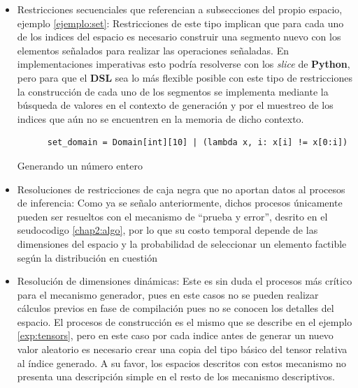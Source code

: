 \begin{itemize}
      \item Restricciones secuenciales que referencian a subsecciones del propio espacio, ejemplo \ref{ejemplo:set}: Restricciones de
            este tipo implican que para cada uno de los indices del espacio es necesario construir una segmento nuevo
            con los elementos señalados para realizar las operaciones señaladas. En implementaciones imperativas esto podría
            resolverse con los {\it slice} de {\bf Python}, pero para que el {\bf DSL} sea lo más flexible posible con este 
            tipo de restricciones la construcción de cada uno de los segmentos se implementa mediante la búsqueda de valores en el 
            contexto de generación y por el muestreo de los indices que aún no se encuentren en la memoria de dicho contexto.   

            \begin{listing}[!ht]
                  \begin{verbatim}
      set_domain = Domain[int][10] | (lambda x, i: x[i] != x[0:i])
                  \end{verbatim}
                  \caption{Generando un número entero}
                  \label{ejemplo:set}
              \end{listing}

      \item Resoluciones de restricciones de caja negra que no aportan datos al procesos de inferencia: Como ya
            se señalo anteriormente, dichos procesos únicamente pueden ser resueltos con el mecanismo de “prueba y error”, desrito en el seudocodigo \ref{chap2:algo},
            por lo que su costo temporal depende de las dimensiones del espacio y la probabilidad de seleccionar un elemento
            factible según la distribución en cuestión
      \item Resolución de dimensiones dinámicas: Este es sin duda el procesos más crítico para el mecanismo generador,
            pues en este casos no se pueden realizar cálculos previos en fase de compilación pues no se conocen los detalles
            del espacio. El procesos de construcción es el mismo que se describe en el ejemplo \ref{exp:tensors}, pero en este caso
            por cada indice antes de generar un nuevo valor aleatorio es necesario crear una copia del tipo básico del tensor relativa al índice generado.
            A su favor, los espacios descritos con estos mecanismo no presenta una descripción simple en el resto de los mecanismo descriptivos.
\end{itemize}


